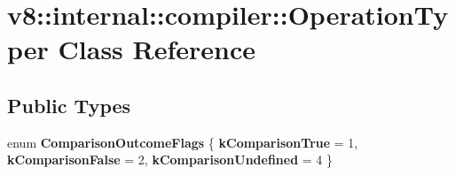 \hypertarget{classv8_1_1internal_1_1compiler_1_1OperationTyper}{}\section{v8\+:\+:internal\+:\+:compiler\+:\+:Operation\+Typer Class Reference}
\label{classv8_1_1internal_1_1compiler_1_1OperationTyper}
\subsection*{Public Types}
\begin{DoxyCompactItemize}
\item 
\mbox{\label{classv8_1_1internal_1_1compiler_1_1OperationTyper_a40cb265ad6a94b132dae540bbc7799f3}} 
enum {\bfseries Comparison\+Outcome\+Flags} \{ {\bfseries k\+Comparison\+True} = 1, 
{\bfseries k\+Comparison\+False} = 2, 
{\bfseries k\+Comparison\+Undefined} = 4
 \}
\end{DoxyCompactItemize}
